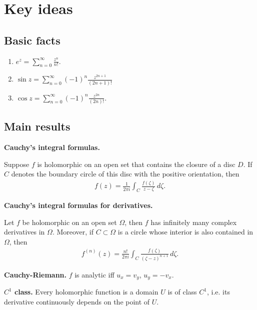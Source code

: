 \documentclass[12pt]{article}
\begin{document}
        \section{Key ideas}

        \subsection{Basic facts}

        \begin{enumerate}
          \item $e^z = \sum_{n=0}^{\infty} \frac{z^n}{n!}$.
          \item $\sin z = \sum_{n=0}^{\infty} (-1)^{n} \frac{z^{2n+1}}{(2n+1)!}$
          \item $\cos z = \sum_{n=0}^{\infty} (-1)^{n} \frac{z^{2n}}{(2n)!}$.
        \end{enumerate}

        \subsection{Main results} 

        {\bf Cauchy's integral formulas.}

        Suppose $f$ is holomorphic on an open set that contains the closure of a disc $D$.  If $C$ denotes the boundary circle of this disc with the positive orientation, then
        \begin{align*}
          f(z) = \frac{1}{2 \pi i} \int_{C} \frac{f(\zeta)}{z - \zeta} \, d \zeta.
        \end{align*}

        {\bf Cauchy's integral formulas for derivatives.}

        Let $f$ be holomorphic on an open set $\Omega$, then $f$ has infinitely many complex derivatives in $\Omega$.  Moreover, if $C \subset \Omega$ is a circle whose interior is also contained in $\Omega$, then
        \begin{align*}
          f^{(n)} (z) = \frac{n!}{2 \pi i} \int_{C} \frac{f(\zeta)}{(\zeta - z)^{n+1}} \, d \zeta.
        \end{align*}

        {\bf Cauchy-Riemann.} $f$ is analytic iff $u_x = v_y$, $u_y = - v_x$.

        {\bf $C^1$ class.} Every holomorphic function is a domain $U$ is of class $C^1$, i.e. its derivative continuously depends on the point of $U$.
\end{document}
